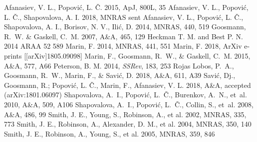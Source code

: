 \documentclass{iau}
\begin{document}
\begin{thebibliography}{}

Afanasiev, V. L., Popovi\'c, L. \v C. 2015, ApJ, 800L, 35
Afanasiev, V. L., Popovi\'c, L. \v C., Shapovalova, A. I. 2018, MNRAS sent
Afanasiev, V. L., Popovi\'c, L. \v C., Shapovalova, A. I.,  
Borisov, N. V., Ili\'c, D. 2014, MNRAS, 440, 519
{Goosmann}, R.~W. \& {Gaskell}, C.~M. 2007, A\&A, 465, 129
Heckman T. M. and Best P. N. 2014 ARAA 52 589
{Marin}, F. 2014, MNRAS, 441, 551
{Marin}, F. 2018, ArXiv e-prints [[arXiv]{1805.09098}]
  {Marin}, F., {Goosmann}, R.~W., \& {Gaskell}, C.~M. 2015, A\&A, 577, A66
{Peterson, B. M.} 2014,
\textit{SSRev}, 183, 253 
{Rojas Lobos}, P.~A., {Goosmann}, R.~W., {Marin}, F., \& {Savi{\'c}}, D. 2018,
  A\&A, 611, A39
Savi\'c, Dj., Goosmann, R.; Popovi\'c, L. \v C., Marin, F., Afanasiev, V. L.
2018, A\&A, accepted
(arXiv:1801.06097) 
{Shapovalova}, A.~I., {Popovi{\'c}}, L.~{\v C}., {Burenkov}, A.~N., {et~al.}
  2010, A\&A, 509, A106
{Shapovalova}, A.~I., {Popovi{\'c}}, L.~{\v C}., {Collin}, S., {et~al.} 2008,
  A\&A, 486, 99
Smith, J. E., Young, S., Robinson, A., et al. 2002, MNRAS, 335, 773
Smith, J. E., Robinson, A., Alexander, D. M., et al. 2004, MNRAS, 350, 140
Smith, J. E., Robinson, A., Young, S., et al. 2005, MNRAS, 359, 846

\end{thebibliography}
\end{document}
